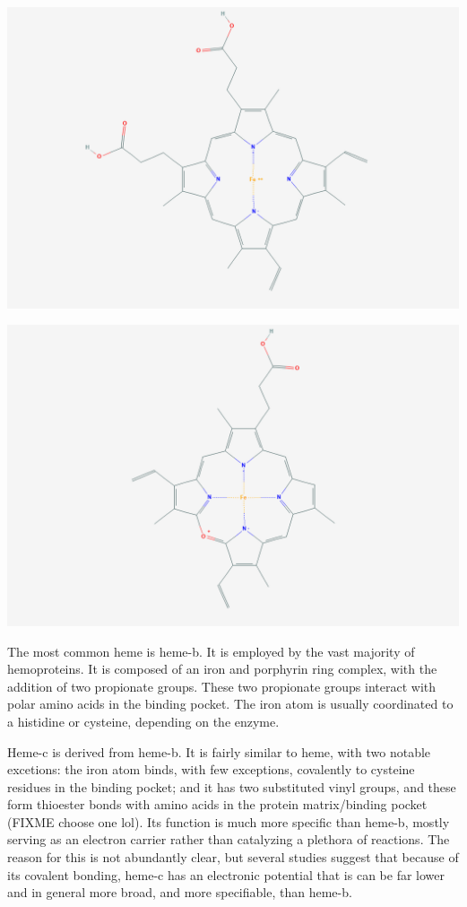 \documentclass[a4paper, nobind]{templates/ociamthesis}
\let\origfigure\figure
\let\endorigfigure\endfigure
\renewenvironment{figure}[1][2] {
    \expandafter\origfigure\expandafter[H]
} {
    \endorigfigure
}
\begin{document}
\begin{figure}

{\centering \includegraphics[width=0.5\linewidth]{figures/VEApubchem} 

}

\caption{Verdoheme, VEA}\label{fig:structVEA}
\end{figure}
\begin{figure}

{\centering \includegraphics[width=0.5\linewidth]{figures/VERpubchem} 

}

\caption{Verdoheme, VER}\label{fig:structVER}
\end{figure}

The most common heme is heme-b. It is employed by the vast majority of hemoproteins. It is composed of an iron and porphyrin ring complex, with the addition of two propionate groups. These two propionate groups interact with polar amino acids in the binding pocket. The iron atom is usually coordinated to a histidine or cysteine, depending on the enzyme.

Heme-c is derived from heme-b. It is fairly similar to heme, with two notable excetions: the iron atom binds, with few exceptions, covalently to cysteine residues in the binding pocket; and it has two substituted vinyl groups, and these form thioester bonds with amino acids in the protein matrix/binding pocket (FIXME choose one lol). Its function is much more specific than heme-b, mostly serving as an electron carrier rather than catalyzing a plethora of reactions. The reason for this is not abundantly clear, but several studies suggest that because of its covalent bonding, heme-c has an electronic potential that is can be far lower and in general more broad, and more specifiable, than heme-b. \autocite{Bowman2008,Kleingardner2015}
\end{document}
